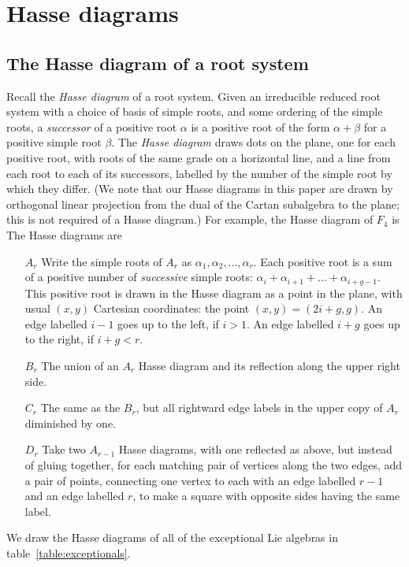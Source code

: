 \documentclass[a4paper,10pt]{amsart}
\theoremstyle{remark}
\begin{document}
\section{Hasse diagrams}
\subsection{The Hasse diagram of a root system}
Recall the \emph{Hasse diagram} of a root system.
Given an irreducible reduced root system with a choice of basis of simple roots, and some ordering of the simple roots, a \emph{successor} of a positive root \(\alpha\) is a positive root of the form \(\alpha+\beta\) for a positive simple root \(\beta\).
The \emph{Hasse diagram} draws dots on the plane, one for each positive root, with roots of the same grade on a horizontal line, and a line from each root to each of its successors, labelled by the number of the simple root by which they differ.
(We note that our Hasse diagrams in this paper are drawn by orthogonal linear projection from the dual of the Cartan subalgebra to the plane; this is not required of a Hasse diagram.)
For example, the Hasse diagram of \(F_4\) is
\tikzset{/Lie Hasse diagram,attach Dynkin diagram=true,three D=true}
The Hasse diagrams are
\begin{enumerate}
\item[\(A_r\)] Write the simple roots of \(A_r\) as \(\alpha_1,\alpha_2,\dots,\alpha_r\).
Each positive root is a sum of a positive number of \emph{successive} simple roots: \(\alpha_i+\alpha_{i+1}+\dots+\alpha_{i+g-1}\).
This positive root is drawn in the Hasse diagram as a point in the plane, with usual \((x,y)\) Cartesian coordinates: the point \((x,y)=(2i+g,g)\). 
An edge labelled \(i-1\) goes up to the left, if \(i>1\).
An edge labelled \(i+g\) goes up to the right, if \(i+g<r\).
\item[\(B_r\)] The union of an \(A_r\) Hasse diagram and its reflection along the upper right side.
\item[\(C_r\)] The same as the \(B_r\), but all rightward edge labels in the upper copy of \(A_r\) diminished by one.
\item[\(D_r\)] 
Take two \(A_{r-1}\) Hasse diagrams, with one reflected as above, but instead of gluing together, for each matching pair of vertices along the two edges, add a pair of points, connecting one vertex to each with an edge labelled \(r-1\) and an edge labelled \(r\), to make a square with opposite sides having the same label.
\end{enumerate}
We draw the Hasse diagrams of all of the exceptional Lie algebras in table~\vref{table:exceptionals}.
\end{document}
